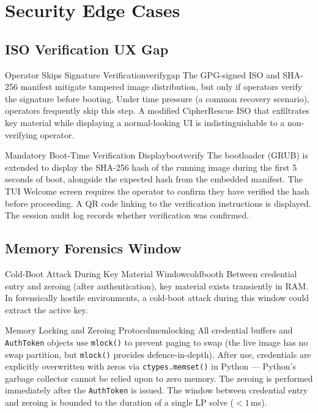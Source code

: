 \documentclass[11pt,a4paper]{report}
\begin{document}
\chapter{Security Edge Cases}

\section{ISO Verification UX Gap}

\begin{edgecase}{Operator Skips Signature Verification}{verifygap}
The GPG-signed ISO and SHA-256 manifest mitigate tampered image distribution, but only if operators verify the signature before booting. Under time pressure (a common recovery scenario), operators frequently skip this step. A modified CipherRescue ISO that exfiltrates key material while displaying a normal-looking UI is indistinguishable to a non-verifying operator.
\end{edgecase}

\begin{solution}{Mandatory Boot-Time Verification Display}{bootverify}
The bootloader (GRUB) is extended to display the SHA-256 hash of the running image during the first 5 seconds of boot, alongside the expected hash from the embedded manifest. The TUI Welcome screen requires the operator to confirm they have verified the hash before proceeding. A QR code linking to the verification instructions is displayed. The session audit log records whether verification was confirmed.
\end{solution}

\section{Memory Forensics Window}

\begin{edgecase}{Cold-Boot Attack During Key Material Window}{coldbooth}
Between credential entry and zeroing (after authentication), key material exists transiently in RAM. In forensically hostile environments, a cold-boot attack during this window could extract the active key.
\end{edgecase}

\begin{solution}{Memory Locking and Zeroing Protocol}{memlocking}
All credential buffers and \texttt{AuthToken} objects use \texttt{mlock()} to prevent paging to swap (the live image has no swap partition, but \texttt{mlock()} provides defence-in-depth). After use, credentials are explicitly overwritten with zeros via \texttt{ctypes.memset()} in Python --- Python's garbage collector cannot be relied upon to zero memory. The zeroing is performed immediately after the \texttt{AuthToken} is issued. The window between credential entry and zeroing is bounded to the duration of a single LP solve ($< 1$\,ms).
\end{solution}
\end{document}
